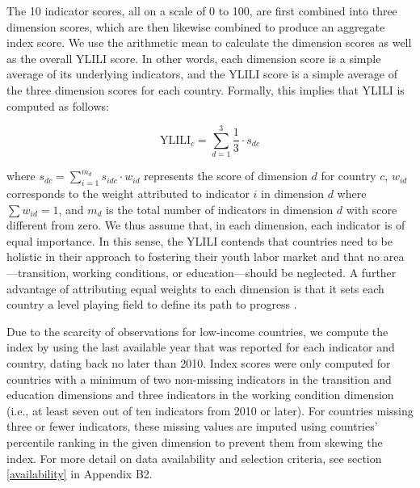 \documentclass[
  a4paper, twoside, 12pt]{book}
\begin{document}
The 10 indicator scores, all on a scale of 0 to 100, are first combined into three dimension scores, which are then likewise combined to produce an aggregate index score. We use the arithmetic mean to calculate the dimension scores as well as the overall YLILI score. In other words, each dimension score is a simple average of its underlying indicators, and the YLILI score is a simple average of the three dimension scores for each country. Formally, this implies that YLILI is computed as follows:

\[ \text{YLILI}_{c}= \sum_{d=1}^{3} \frac{1}{3} \cdot s_{dc}  \]
\vspace*{5pt}

where \(s_{dc}= \sum_{i=1}^{m_d} s_{idc} \cdot w_{id}\) represents the score of dimension \(d\) for country \(c\), \(w_{id}\) corresponds to the weight attributed to indicator \(i\) in dimension \(d\) where \(\sum w_{id}=1\), and \(m_d\) is the total number of indicators in dimension \(d\) with score different from zero. We thus assume that, in each dimension, each indicator is of equal importance. In this sense, the YLILI contends that countries need to be holistic in their approach to fostering their youth labor market and that no area---transition, working conditions, or education---should be neglected. A further advantage of attributing equal weights to each dimension is that it sets each country a level playing field to define its path to progress \autocite{wef2018}.

Due to the scarcity of observations for low-income countries, we compute the index by using the last available year that was reported for each indicator and country, dating back no later than 2010. Index scores were only computed for countries with a minimum of two non-missing indicators in the transition and education dimensions and three indicators in the working condition dimension (i.e., at least seven out of ten indicators from 2010 or later). For countries missing three or fewer indicators, these missing values are imputed using countries' percentile ranking in the given dimension to prevent them from skewing the index. For more detail on data availability and selection criteria, see section \ref{availability} in Appendix B2.
\end{document}
